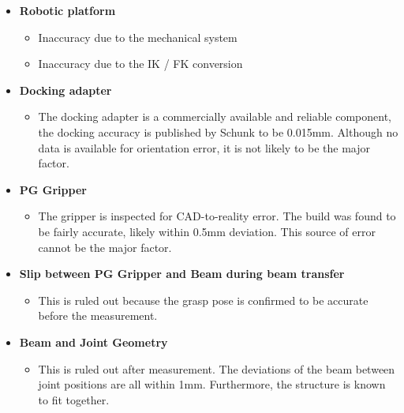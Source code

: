 \begin{itemize}
	\item \textbf{Robotic platform}

\begin{itemize}
	\item Inaccuracy due to the mechanical system

	\item Inaccuracy due to the IK / FK conversion

\end{itemize}
	\item \textbf{Docking adapter}

\begin{itemize}
	\item The docking adapter is a commercially available and reliable component, the docking accuracy is published by Schunk to be 0.015mm. Although no data is available for orientation error, it is not likely to be the major factor.

\end{itemize}
    \item\textbf{PG Gripper}

\begin{itemize}
	\item The gripper is inspected for CAD-to-reality error. The build was found to be fairly accurate, likely within 0.5mm deviation. This source of error cannot be the major factor.

\end{itemize}
    \item\textbf{Slip between PG Gripper and Beam during beam transfer}

\begin{itemize}
	\item This is ruled out because the grasp pose is confirmed to be accurate before the measurement.

\end{itemize}
    \item\textbf{Beam and Joint Geometry}

\begin{itemize}
	\item This is ruled out after measurement. The deviations of the beam between joint positions are all within 1mm. Furthermore, the structure is known to fit together.

\end{itemize}
\end{itemize}


